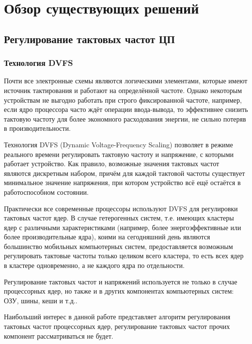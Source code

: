 \section{Обзор существующих решений}
\label{sec:Section2} 

\subsection{Регулирование тактовых частот ЦП}

\subsubsection{Технология DVFS} \label{DVFS_Chapter}

    Почти все электронные схемы являются логическими элементами, которые имеют источник тактирования
    и работают на определённой частоте. Однако некоторым устройствам не выгодно работать при
    строго фиксированной частоте, например, если ядро процессора часто ждёт операции ввода-вывода,
    то эффективнее снизить тактовую частоту для более экономного расходования энергии, не сильно
    потеряв в производительности.

    Технология DVFS (Dynamic Voltage-Frequency Scaling) позволяет в режиме реального времени
    регулировать тактовую частоту и напряжение, с которыми работает устройство. Как правило,
    возможные значения тактовых частот являются дискретным набором, причём для каждой тактовой частоты
    существует минимальное значение напряжения, при котором устройство всё ещё остаётся в
    работоспособном состоянии.

    Практически все современные процессоры используют DVFS для регулировки тактовых частот ядер. В случае
    гетерогенных систем, т.е. имеющих кластеры ядер с различными характеристиками (например, более
    энергоэффективные или более производительные ядра), коими на сегодняшний день являются
    большинство мобильных компьютерных систем, предоставляется возможным регулировать тактовые частоты
    только целиком всего кластера, то есть всех ядер в кластере одновременно, а не каждого ядра по отдельности.

    Регулирование тактовых частот и напряжений используется не только в случае процессорных ядер, но также
    и в других компонентах компьютерных систем: ОЗУ, шины, кеши и т.д..

    Наибольший интерес в данной работе представляет алгоритм регулирования тактовых частот процессорных
    ядер, регулирование тактовых частот прочих компонент рассматриваться не будет.

